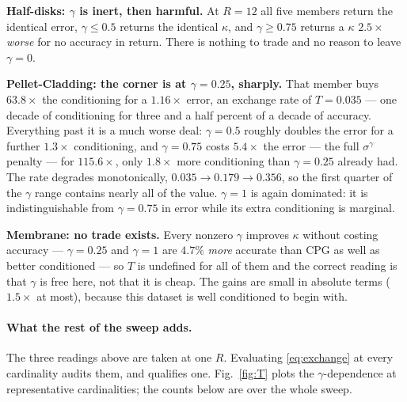 \documentclass[11pt,a4paper]{article}
\begin{document}
\noindent \textbf{Half-disks: $\gamma$ is inert, then harmful.} At $R=12$ all five members
return the identical error, $\gamma\le0.5$ returns the identical $\kappa$, and
$\gamma\ge0.75$ returns a $\kappa$ $2.5\times$ \emph{worse} for no accuracy in return.
There is nothing to trade and no reason to leave $\gamma=0$.

\noindent \textbf{Pellet-Cladding: the corner is at $\gamma=0.25$, sharply.} That member
buys $63.8\times$ the conditioning for a $1.16\times$ error, an exchange rate of
$T=0.035$ --- one decade of conditioning for three and a half percent of a decade of
accuracy. Everything past it is a much worse deal: $\gamma=0.5$ roughly doubles the
error for a further $1.3\times$ conditioning, and $\gamma=0.75$ costs $5.4\times$ the
error --- the full $\sigma^{\gamma}$ penalty --- for $115.6\times$, only $1.8\times$ more
conditioning than $\gamma=0.25$ already had. The rate degrades monotonically, $0.035 \to
0.179 \to 0.356$, so the first quarter of the $\gamma$ range contains nearly all of the
value. $\gamma=1$ is again dominated: it is indistinguishable from $\gamma=0.75$ in error
while its extra conditioning is marginal.

\noindent \textbf{Membrane: no trade exists.} Every nonzero $\gamma$ improves $\kappa$
without costing accuracy --- $\gamma=0.25$ and $\gamma=1$ are $4.7\%$ \emph{more} accurate
than CPG as well as better conditioned --- so $T$ is undefined for all of them and the
correct reading is that $\gamma$ is free here, not that it is cheap. The gains are small
in absolute terms ($1.5\times$ at most), because this dataset is well conditioned to begin
with.

\paragraph{What the rest of the sweep adds.} The three readings above are taken at one
$R$. Evaluating \eqref{eq:exchange} at every cardinality audits them, and qualifies one.
Fig.~\ref{fig:T} plots the $\gamma$-dependence at representative cardinalities; the counts
below are over the whole sweep.
\end{document}
